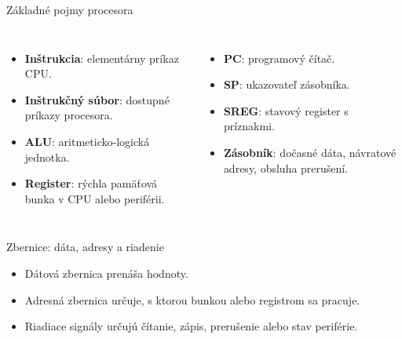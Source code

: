 \begin{frame}{Základné pojmy procesora}
\begin{columns}[T,onlytextwidth]
\begin{itemize}
  \item \textbf{Inštrukcia}: elementárny príkaz CPU.
  \item \textbf{Inštrukčný súbor}: dostupné príkazy procesora.
  \item \textbf{ALU}: aritmeticko-logická jednotka.
  \item \textbf{Register}: rýchla pamäťová bunka v CPU alebo periférii.
\end{itemize}
\begin{itemize}
  \item \textbf{PC}: programový čítač.
  \item \textbf{SP}: ukazovateľ zásobníka.
  \item \textbf{SREG}: stavový register s príznakmi.
  \item \textbf{Zásobník}: dočasné dáta, návratové adresy, obsluha prerušení.
\end{itemize}
\end{columns}
\end{frame}

\begin{frame}{Zbernice: dáta, adresy a riadenie}
\begin{center}
\end{center}
\begin{itemize}
  \item Dátová zbernica prenáša hodnoty.
  \item Adresná zbernica určuje, s ktorou bunkou alebo registrom sa pracuje.
  \item Riadiace signály určujú čítanie, zápis, prerušenie alebo stav periférie.
\end{itemize}
\end{frame}

